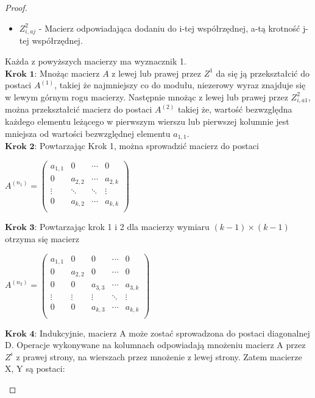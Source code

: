 \begin{proof}
\begin{itemize}
\item $Z^2_{i,aj}$ -  Macierz odpowiadająca dodaniu do  i-tej współrzędnej, a-tą krotność j-tej współrzędnej.
\end{itemize}
Każda z powyższych macierzy ma wyznacznik 1. \\
$\textbf{Krok 1:}$ Mnożąc macierz $A$ z lewej lub prawej przez $Z^1$ da się 
ją przekształcić do postaci $A^(1)$, takiej że najmniejszy co do modułu, niezerowy wyraz znajduje się w lewym górnym rogu macierzy. Następnie mnożąc z lewej lub prawej przez 
$Z^2_{i,a1}$, można przekształcić macierz do postaci $A^(2)$ takiej że, wartość bezwzględna każdego elementu leżącego w pierwszym wierszu lub pierwszej kolumnie jest mniejsza od wartości bezwzględnej elementu $a_{1,1}$. \\
$\textbf{Krok 2:}$ Powtarzając Krok 1, można sprowadzić macierz do postaci 
\begin{center}
$A^(n_{1})=\begin{pmatrix}
a_{1,1} & 0 & \cdots & 0 \\
0 & a_{2,2} & \cdots & a_{2,k} \\
\vdots & \ddots & \ddots & \vdots \\
0 & a_{k,2} & \cdots & a_{k,k} \\
\end{pmatrix}$
\end{center}
$\textbf{Krok 3:}$ Powtarzając krok 1 i 2 dla macierzy wymiaru $(k-1) \times (k-1)$ otrzyma się macierz 
\begin{center}
$A^(n_{2})=\begin{pmatrix}
a_{1,1} & 0 & 0 & \cdots & 0 \\
0 & a_{2,2} & 0 & \cdots & 0 \\
0 & 0 & a_{3,3} & \cdots & a_{3,k} \\
\vdots & \vdots & \vdots & \ddots  & \vdots \\
0 & 0 & a_{k,3} & \cdots & a_{k,k} \\
\end{pmatrix}$ \\
\end{center}
$\textbf{Krok 4:}$ Indukcyjnie, macierz A może zostać sprowadzona do postaci diagonalnej D. Operacje wykonywane na kolumnach odpowiadają mnożeniu macierz A przez $Z^i$ z prawej strony, na wierszach przez mnożenie z lewej strony. Zatem macierze X, Y są postaci: \\

	\begin{minipage}{0.5\textwidth}
	\begin{center}
	

\end{center}
\end{minipage}
\end{proof}
